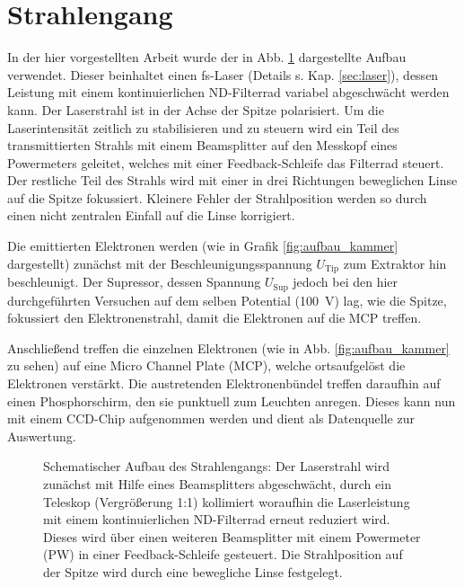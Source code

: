 \documentclass[bachelor,       %
               twoside,        %
               BCOR10mm,       %
               english,ngerman, %
               final,          %
               ]{GAUBM}
\begin{document}
\section{Strahlengang}
In der hier vorgestellten Arbeit wurde der in Abb. \ref{fig:aufbau} dargestellte Aufbau verwendet.
Dieser beinhaltet einen fs-Laser (Details s. Kap. \ref{sec:laser}), dessen Leistung mit einem kontinuierlichen ND-Filterrad variabel abgeschwächt werden kann.
Der Laserstrahl ist in der Achse der Spitze polarisiert.
Um die Laserintensität zeitlich zu stabilisieren und zu steuern wird ein Teil des transmittierten Strahls mit einem Beamsplitter auf den Messkopf eines Powermeters geleitet, welches mit einer Feedback-Schleife das Filterrad steuert.
Der restliche Teil des Strahls wird mit einer in drei Richtungen beweglichen Linse auf die Spitze fokussiert.
Kleinere Fehler der Strahlposition werden so durch einen nicht zentralen Einfall auf die Linse korrigiert.


Die emittierten Elektronen werden (wie in Grafik \ref{fig:aufbau_kammer} dargestellt) zunächst mit der Beschleunigungsspannung $U_\text{Tip}$ zum Extraktor hin beschleunigt.
Der Supressor, dessen Spannung $U_\text{Sup}$ jedoch bei den hier durchgeführten Versuchen auf dem selben Potential (\SI{100}{\V}) lag, wie die Spitze, fokussiert den Elektronenstrahl, damit die Elektronen auf die MCP treffen.\newline

Anschließend treffen die einzelnen Elektronen (wie in Abb. \ref{fig:aufbau_kammer} zu sehen) auf eine Micro Channel Plate (MCP), welche ortsaufgelöst die Elektronen verstärkt.
Die austretenden Elektronenbündel treffen daraufhin auf einen Phosphorschirm, den sie punktuell zum Leuchten anregen.
Dieses kann nun mit einem CCD-Chip aufgenommen werden und dient als Datenquelle zur Auswertung.


\begin{figure}[h!]
	\centering
	\def\svgwidth{0.7\textwidth}
	
	\caption{Schematischer Aufbau des Strahlengangs: Der Laserstrahl wird zunächst mit Hilfe eines Beamsplitters abgeschwächt, durch ein Teleskop (Vergrößerung 1:1)  kollimiert woraufhin die Laserleistung mit einem kontinuierlichen ND-Filterrad erneut reduziert wird. Dieses wird über einen weiteren Beamsplitter mit einem Powermeter (PW) in einer Feedback-Schleife gesteuert. Die Strahlposition auf der Spitze wird durch eine bewegliche Linse festgelegt.}
	\label{fig:aufbau}
\end{figure}
\end{document}
